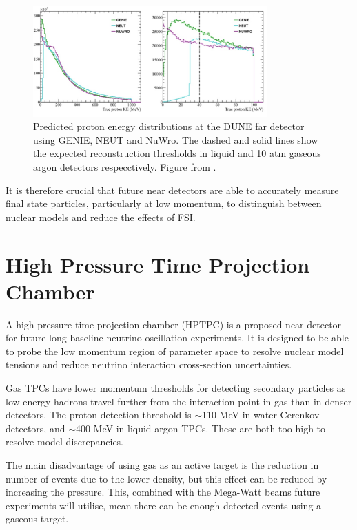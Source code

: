 \begin{figure}
\centering
\includegraphics*[width=0.8\textwidth,clip]{figs/neutgenienuwro}
\caption{Predicted proton energy distributions at the DUNE far detector using GENIE, NEUT and NuWro. The dashed and solid lines show the expected reconstruction thresholds in liquid and 10 atm gaseous argon detectors respecctively. Figure from \cite{dunehptpc}.}\label{fig:generators}
\end{figure}

It is therefore crucial that future near detectors are able to accurately measure final state particles, particularly at low momentum, to distinguish between nuclear models and reduce the effects of FSI.

\section{High Pressure Time Projection Chamber}

A high pressure time projection chamber (HPTPC) is a proposed near detector for future long baseline neutrino oscillation experiments. It is designed to be able to probe the low momentum region of parameter space to resolve nuclear model tensions and reduce neutrino interaction cross-section uncertainties.

Gas TPCs have lower momentum thresholds for detecting secondary particles as low energy hadrons travel further from the interaction point in gas than in denser detectors. The proton detection threshold is $\sim$110 MeV in water Cerenkov detectors, and $\sim$400 MeV in liquid argon TPCs. These are both too high to resolve model discrepancies. 

The main disadvantage of using gas as an active target is the reduction in number of events due to the lower density, but this effect can be reduced by increasing the pressure. This, combined with the Mega-Watt beams future experiments will utilise, mean there can be enough detected events using a gaseous target.

